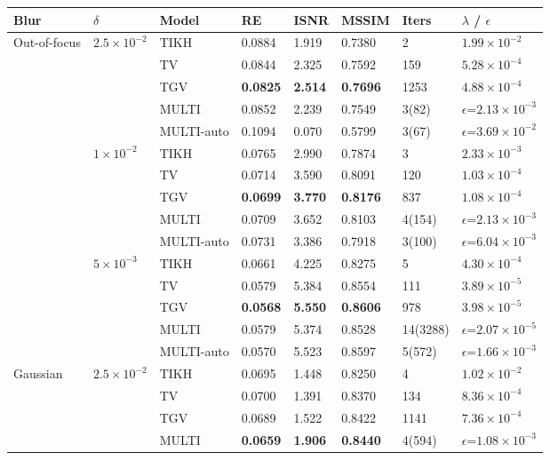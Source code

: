 \begin{tabular}{llllllll}
\toprule
Blur & $\delta$ & Model & RE & ISNR & MSSIM & Iters & $\lambda$ / $\epsilon$ \\
\midrule
\multirow{15}{*}{Out-of-focus} & \multirow{5}{*}{$2.5\times 10^{-2}$} & TIKH & 0.0884 & 1.919 & 0.7380 & 2 & $1.99\times 10^{-2}$ \\
 &  & TV & 0.0844 & 2.325 & 0.7592 & 159 & $5.28\times 10^{-4}$ \\
 &  & TGV & \textbf{0.0825} & \textbf{2.514} & \textbf{0.7696} & 1253 & $4.88\times 10^{-4}$ \\
 &  & MULTI & 0.0852 & 2.239 & 0.7549 & 3(82) & $\epsilon$=$2.13\times 10^{-3}$ \\
 &  & MULTI-auto & 0.1094 & 0.070 & 0.5799 & 3(67) & $\epsilon$=$3.69\times 10^{-2}$ \\
\cmidrule{2-8}
 & \multirow{5}{*}{$1\times 10^{-2}$} & TIKH & 0.0765 & 2.990 & 0.7874 & 3 & $2.33\times 10^{-3}$ \\
 &  & TV & 0.0714 & 3.590 & 0.8091 & 120 & $1.03\times 10^{-4}$ \\
 &  & TGV & \textbf{0.0699} & \textbf{3.770} & \textbf{0.8176} & 837 & $1.08\times 10^{-4}$ \\
 &  & MULTI & 0.0709 & 3.652 & 0.8103 & 4(154) & $\epsilon$=$2.13\times 10^{-3}$ \\
 &  & MULTI-auto & 0.0731 & 3.386 & 0.7918 & 3(100) & $\epsilon$=$6.04\times 10^{-3}$ \\
\cmidrule{2-8}
 & \multirow{5}{*}{$5\times 10^{-3}$} & TIKH & 0.0661 & 4.225 & 0.8275 & 5 & $4.30\times 10^{-4}$ \\
 &  & TV & 0.0579 & 5.384 & 0.8554 & 111 & $3.89\times 10^{-5}$ \\
 &  & TGV & \textbf{0.0568} & \textbf{5.550} & \textbf{0.8606} & 978 & $3.98\times 10^{-5}$ \\
 &  & MULTI & 0.0579 & 5.374 & 0.8528 & 14(3288) & $\epsilon$=$2.07\times 10^{-5}$ \\
 &  & MULTI-auto & 0.0570 & 5.523 & 0.8597 & 5(572) & $\epsilon$=$1.66\times 10^{-3}$ \\
\midrule
\multirow{15}{*}{Gaussian} & \multirow{5}{*}{$2.5\times 10^{-2}$} & TIKH & 0.0695 & 1.448 & 0.8250 & 4 & $1.02\times 10^{-2}$ \\
 &  & TV & 0.0700 & 1.391 & 0.8370 & 134 & $8.36\times 10^{-4}$ \\
 &  & TGV & 0.0689 & 1.522 & 0.8422 & 1141 & $7.36\times 10^{-4}$ \\
 &  & MULTI & \textbf{0.0659} & \textbf{1.906} & \textbf{0.8440} & 4(594) & $\epsilon$=$1.08\times 10^{-3}$ \\

\end{tabular}
